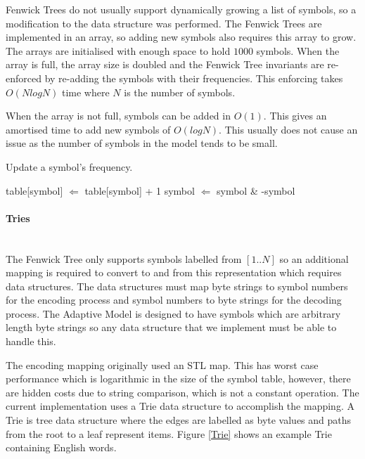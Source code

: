 \documentclass[a4paper,11pt]{report}
\begin{document}
Fenwick Trees do not usually support dynamically growing a list of symbols, so a modification to the data structure was performed. The Fenwick Trees are implemented in an array, so adding new symbols also requires this array to grow. The arrays are initialised with enough space to hold $1000$ symbols. When the array is full, the array size is doubled and the Fenwick Tree invariants are re-enforced by re-adding the symbols with their frequencies. This enforcing takes $O(NlogN)$ time where $N$ is the number of symbols. 

When the array is not full, symbols can be added in $O(1)$. This gives an amortised time to add new symbols of $O(logN)$. This usually does not cause an issue as the number of symbols in the model tends to be small. 


\begin{algorithm}                      %
\caption{Update a symbol's frequency.}          %
\label{alg:update}                           %
\begin{algorithmic}                    %
\STATE table[symbol] $\Leftarrow$ table[symbol] + 1
\STATE symbol $\Leftarrow$ symbol \& -symbol
\ENDWHILE
\end{algorithmic}
\end{algorithm}

\paragraph{Tries} \ \\
The Fenwick Tree only supports symbols labelled from $[1..N]$ so an additional mapping is required to convert to and from this representation which requires data structures. The data structures must map byte strings to symbol numbers for the encoding process and symbol numbers to byte strings for the decoding process. The Adaptive Model is designed to have symbols which are arbitrary length byte strings so any data structure that we implement must be able to handle this. 

The encoding mapping originally used an STL map. This has worst case performance which is logarithmic in the size of the symbol table, however, there are hidden costs due to string comparison, which is not a constant operation. The current implementation uses a Trie data structure to accomplish the mapping. A Trie is tree data structure where the edges are labelled as byte values and paths from the root to a leaf represent items. Figure \ref{Trie} shows an example Trie containing English words.
\end{document}
